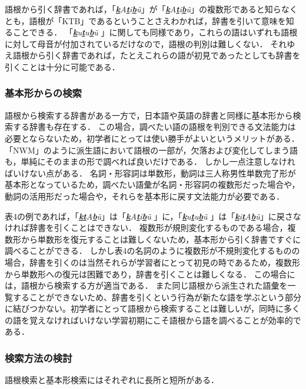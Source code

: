 \documentclass[technicalreport]{ieicej}
\begin{document}
語根から引く辞書であれば，「\textit{\underline{\textbf{k}}A\underline{\textbf{t}}i\underline{\textbf{b}}\~u}」が「\textit{\underline{\textbf{k}}A\underline{\textbf{t}}i\underline{\textbf{b}}\~u}」の複数形であると知らなくとも，語根が「KTB」であるということさえわかれば，辞書を引いて意味を知ることできる．
「\textit{\underline{\textbf{k}}u\underline{\textbf{t}}u\underline{\textbf{b}}\~u} 」に関しても同様であり，これらの語はいずれも語根に対して母音が付加されているだけなので，語根の判別は難しくない．
それゆえ語根から引く辞書であれば，たとえこれらの語が初見であったとしても辞書を引くことは十分に可能である．

\subsubsection{基本形からの検索}
語根から検索する辞書がある一方で，日本語や英語の辞書と同様に基本形から検索する辞書も存在する．
この場合，調べたい語の語根を判別できる文法能力は必要とならないため，初学者にとっては使い勝手がよいというメリットがある．
「NWM」のように派生語において語根の一部が，欠落および変化してしまう語も，単純にそのままの形で調べれば良いだけである．
しかし一点注意しなければいけない点がある．
名詞・形容詞は単数形，動詞は三人称男性単数完了形が基本形となっているため，調べたい語彙が名詞・形容詞の複数形だった場合や，動詞の活用形だった場合や，それらを基本形に戻す文法能力が必要である．

表4の例であれば，「\textit{\underline{\textbf{k}}\underline{\textbf{t}}A\underline{\textbf{b}}\~u}」は「\textit{\underline{\textbf{k}}A\underline{\textbf{t}}i\underline{\textbf{b}}\~u} 」に，「\textit{\underline{\textbf{k}}u\underline{\textbf{t}}u\underline{\textbf{b}}\~u} 」は「\textit{\underline{\textbf{k}}i\underline{\textbf{t}}A\underline{\textbf{b}}\~u}」に戻さなければ辞書を引くことはできない．
複数形が規則変化するものである場合，複数形から単数形を復元することは難しくないため，基本形から引く辞書ですぐに調べることができる．
しかし表4の名詞のように複数形が不規則変化するものの場合，辞書を引くのは当然それらが学習者にとって初見の時であるため，複数形から単数形への復元は困難であり，辞書を引くことは難しくなる．
この場合には，語根から検索する方が適当である．
また同じ語根から派生された語彙を一覧することができないため、辞書を引くという行為が新たな語を学ぶという部分に結びつかない。初学者にとって語根から検索することは難しいが，同時に多くの語を覚えなければいけない学習初期にこそ語根から語を調べることが効率的である．

\subsubsection{検索方法の検討}
語根検索と基本形検索にはそれぞれに長所と短所がある．
\end{document}
